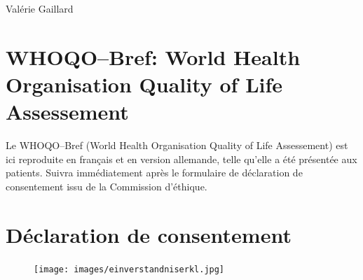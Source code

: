 Valérie Gaillard


\section{WHOQO--Bref: World Health
   Organisation Quality of Life Assessement}

Le WHOQO--Bref (World Health
   Organisation Quality of Life Assessement) est ici reproduite en
   français et en
   version allemande, telle qu'elle a été présentée aux patients.
Suivra immédiatement après le  formulaire de déclaration de  consentement issu de la Commission 
d'éthique.











\section{Déclaration de consentement}
\begin{figure}[bh]
	\centering
	\texttt{[image: images/einverstandniserkl.jpg]}
	\label{fig:déclaration de consentement}
\end{figure}

%
%
%
%
%
